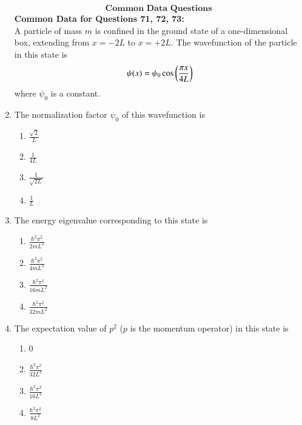 \documentclass[journal]{IEEEtran}
\begin{document}
\begin{enumerate}[start=69]
\begin{enumerate}
    \end{enumerate}



  $$\textbf{Common Data Questions }$$  
\textbf{Common Data for Questions 71, 72, 73:} \\
A particle of mass $m$ is confined in the ground state of a one-dimensional box, extending from $x = -2L$ to $x = +2L$. The wavefunction of the particle in this state is 
\begin{align*}
    \psi(x) = \psi_0 \cos\left(\frac{\pi x}{4L}\right)
\end{align*}
where $\psi_0$ is a constant.

    \item The normalization factor $\psi_0$ of this wavefunction is 
    \begin{multicols}{4}
        \begin{enumerate}
            \item $\frac{\sqrt{2}}{L}$
            \item $\frac{1}{4L}$
            \item $\frac{1}{\sqrt{2L}}$
            \item $\frac{1}{L}$
        \end{enumerate}
    \end{multicols}

\item The energy eigenvalue corresponding to this state is 
\begin{multicols}{4}
 \begin{enumerate}
    \item $\frac{\hbar^2 \pi^2}{2mL^2}$
    \item $\frac{\hbar^2 \pi^2}{4mL^2}$
    \item $\frac{\hbar^2 \pi^2}{16mL^2}$
    \item $\frac{\hbar^2 \pi^2}{32mL^2}$
\end{enumerate}
\end{multicols}

\item The expectation value of $p^2$ ($p$ is the momentum operator) in this state is 
\begin{multicols}{4}
\begin{enumerate}
    \item 0
    \item $\frac{\hbar^2 \pi^2}{32L^2}$
    \item $\frac{\hbar^2 \pi^2}{16L^2}$
    \item $\frac{\hbar^2 \pi^2}{8L^2}$
\end{enumerate}
\end{multicols}


\end{enumerate}
\end{document}
